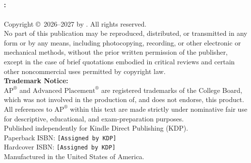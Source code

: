 ﻿%

\thispagestyle{empty}
\begin{center}
  \vspace*{2cm}
  {\Huge\bfseries\color{MidnightBlue} \BookTitle}\\[12pt]
  {\Large\color{DarkSlateGray} \BookSubtitle}\\[24pt]
  {\large\bfseries \BookSeries}\\[36pt]
  {\Large \BookAuthor}\\[24pt]
  {\normalsize \Edition}
\end{center}
\clearpage

\thispagestyle{empty}
\vspace*{\fill}
\begin{center}
  \begin{minipage}{0.9\linewidth}
    \small
    \textbf{\BookTitle: \BookSubtitle}\\
    \BookSeries\\[6pt]
    Copyright \copyright\ 2026--2027 by \BookAuthor. All rights reserved.\\[10pt]
    No part of this publication may be reproduced, distributed, or transmitted in any form or by any means, including photocopying, recording, or other electronic or mechanical methods, without the prior written permission of the publisher, except in the case of brief quotations embodied in critical reviews and certain other noncommercial uses permitted by copyright law.\\[10pt]
    \textbf{Trademark Notice:}\\
    $\text{AP}^\circledR$ and $\text{Advanced Placement}^\circledR$ are registered trademarks of the College Board, which was not involved in the production of, and does not endorse, this product. All references to $\text{AP}^\circledR$ within this text are made strictly under nominative fair use for descriptive, educational, and exam-preparation purposes.\\[10pt]
    Published independently for Kindle Direct Publishing (KDP).\\
    Paperback ISBN: \texttt{[Assigned by KDP]}\\
    Hardcover ISBN: \texttt{[Assigned by KDP]}\\
    Manufactured in the United States of America.
  \end{minipage}
\end{center}
\vspace*{\fill}
\clearpage

